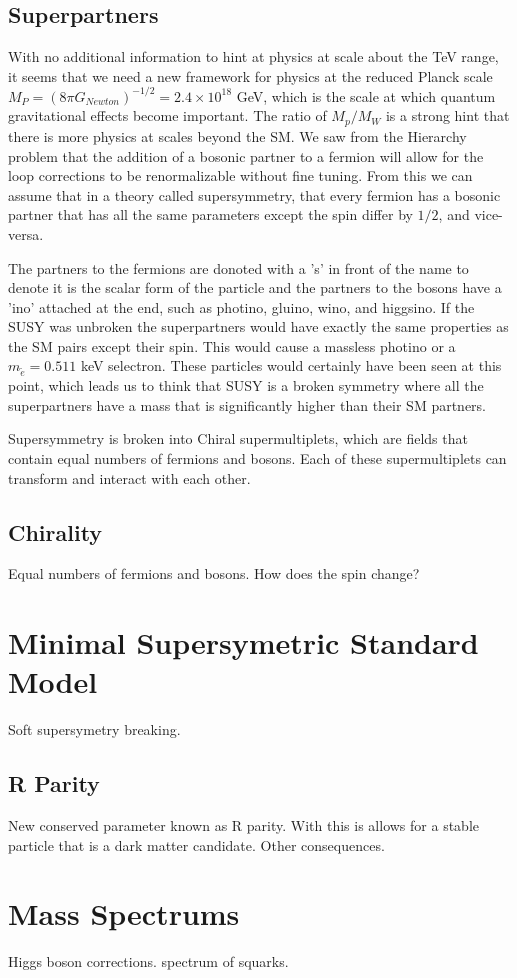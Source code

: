 \subsection{Superpartners}
\label{sec:superpartners}

With no additional information to hint at physics at scale about the TeV range, it seems that we need a new framework for physics at the reduced Planck scale $M_{P}=(8\pi G_{Newton})^{-1/2}=2.4\times10^{18}$ GeV, which is the scale at which quantum gravitational effects become important. The ratio of $M_p/M_W$ is a strong hint that there is more physics at scales beyond the SM. We saw from the Hierarchy problem that the addition of a bosonic partner to a fermion will allow for the loop corrections to be renormalizable without fine tuning. From this we can assume that in a theory called supersymmetry, that every fermion has a bosonic partner that has all the same parameters except the spin differ by $1/2$, and vice-versa.

The partners to the fermions are donoted with a 's' in front of the name to denote it is the scalar form of the particle and the partners to the bosons have a 'ino' attached at the end, such as photino, gluino, wino, and higgsino. If the SUSY was unbroken the superpartners would have exactly the same properties as the SM pairs except their spin. This would cause a massless photino or a $m_{\tilde{e}}=0.511$ keV selectron. These particles would certainly have been seen at this point, which leads us to think that SUSY is a broken symmetry where all the superpartners have a mass that is significantly higher than their SM partners. 

Supersymmetry is broken into Chiral supermultiplets, which are fields that contain equal numbers of fermions and bosons. Each of these supermultiplets can transform and interact with each other. 

\subsection{Chirality}
\label{subsec:chiral}

Equal numbers of fermions and bosons. How does the spin change? 

\section{Minimal Supersymetric Standard Model}
\label{sec:MSSM}

Soft supersymetry breaking. 

\subsection{R Parity}
\label{subsec:rparity}

New conserved parameter known as R parity. With this is allows for a stable particle that is a dark matter candidate. Other consequences.

\section{Mass Spectrums}

Higgs boson corrections. spectrum of squarks. 






